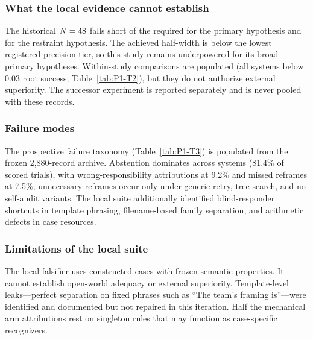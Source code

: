 \subsubsection{What the local evidence cannot establish}
The historical $N=48{}$ falls short of the required
\RequiredNForHOne{} for the primary hypothesis and \RequiredNForHTwo{} for the
restraint hypothesis. The achieved half-width \AchievedHalfWidth{} is below the
lowest registered precision tier, so this study remains underpowered for its
broad primary hypotheses.
Within-study comparisons are populated (all systems below 0.03 root success;
Table~\ref{tab:P1-T2}), but they do not authorize external superiority. The
successor experiment is reported separately and is never pooled with these
records.



\subsubsection{Failure modes}
The prospective failure taxonomy (Table~\ref{tab:P1-T3}) is populated from the
frozen 2,880-record archive. Abstention dominates across systems (81.4\% of
scored trials), with wrong-responsibility attributions at 9.2\% and missed
reframes at 7.5\%; unnecessary reframes occur only under generic retry, tree
search, and no-self-audit variants. The local suite additionally identified
blind-responder shortcuts in template phrasing, filename-based family
separation, and arithmetic defects in case resources.



\subsubsection{Limitations of the local suite}
The local falsifier uses constructed cases with frozen semantic properties. It
cannot establish open-world adequacy or external superiority. Template-level
leaks---perfect separation on fixed phrases such as ``The team's framing
is''---were identified and documented but not repaired in this iteration. Half
the mechanical arm attributions rest on singleton rules that may function as
case-specific recognizers.

